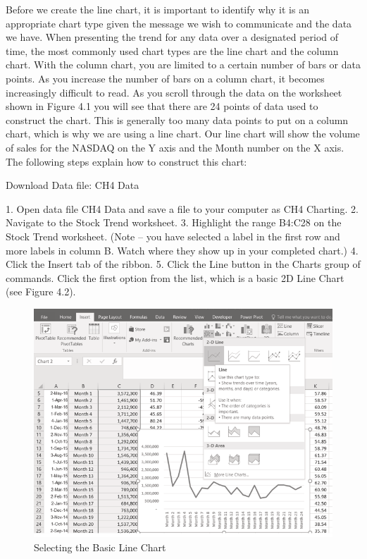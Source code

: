 Before we create the line chart, it is important to identify why it is an appropriate chart type given the
message we wish to communicate and the data we have. When presenting the trend for any data over
a designated period of time, the most commonly used chart types are the line chart and the column
chart. With the column chart, you are limited to a certain number of bars or data points. As you
increase the number of bars on a column chart, it becomes increasingly difficult to read. As you scroll
through the data on the worksheet shown in Figure 4.1 you will see that there are 24 points of data
used to construct the chart. This is generally too many data points to put on a column chart, which is
why we are using a line chart. Our line chart will show the volume of sales for the NASDAQ on the Y
axis and the Month number on the X axis. The following steps explain how to construct this chart:

Download Data file: CH4 Data

1. Open data file CH4 Data and save a file to your computer as CH4 Charting.
2. Navigate to the Stock Trend worksheet.
3. Highlight the range B4:C28 on the Stock Trend worksheet. (Note – you have selected a label in
the first row and more labels in column B. Watch where they show up in your completed chart.)
4. Click the Insert tab of the ribbon.
5. Click the Line button in the Charts group of commands. Click the first option from the list,
which is a basic 2D Line Chart (see Figure 4.2).

\begin{figure}[H]
	\centering
	\includegraphics[width=\maxwidth{.95\linewidth}]{gfx/ch04_fig02}
	\caption{Selecting the Basic Line Chart}
	\label{04:fig02}
\end{figure}




